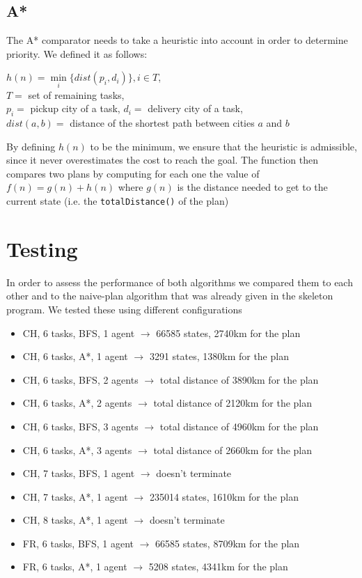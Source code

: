 \documentclass[12pt,a4paper]{article}
\begin{document}
\subsection*{A*}
The A* comparator needs to take a heuristic into account in order to determine priority. We defined it as follows: 
\begin{center}
$h(n) = \min\limits_{i}\lbrace dist(p_i, d_i)\rbrace, i \in T$, \\
$T = $ set of remaining tasks, \\
$p_i = $ pickup city of a task, $d_i = $ delivery city of a task, \\
$dist(a,b) = $ distance of the shortest path between cities $a$ and $b$
\end{center}
By defining $h(n)$ to be the minimum, we ensure that the heuristic is admissible, since it never overestimates the cost to reach the goal. The function then compares two plans by computing for each one the value of $f(n) = g(n) + h(n)$ where $g(n)$ is the distance needed to get to the current state (i.e. the \texttt{totalDistance()} of the plan)

\section{Testing}
In order to assess the performance of both algorithms we compared them to each other and to the naive-plan algorithm that was already given in the skeleton program. We tested these using different configurations
\begin{itemize}
\item CH, 6 tasks, BFS, 1 agent $\rightarrow$ 66585 states, 2740km for the plan
\item CH, 6 tasks, A*, 1 agent $\rightarrow$ 3291 states, 1380km for the plan
\item CH, 6 tasks, BFS, 2 agents $\rightarrow$ total distance of 3890km for the plan
\item CH, 6 tasks, A*, 2 agents $\rightarrow$ total distance of 2120km for the plan
\item CH, 6 tasks, BFS, 3 agents $\rightarrow$ total distance of 4960km for the plan
\item CH, 6 tasks, A*, 3 agents $\rightarrow$ total distance of 2660km for the plan
\item CH, 7 tasks, BFS, 1 agent $\rightarrow$ doesn't terminate
\item CH, 7 tasks, A*, 1 agent $\rightarrow$ 235014 states, 1610km for the plan
\item CH, 8 tasks, A*, 1 agent $\rightarrow$ doesn't terminate
\item FR, 6 tasks, BFS, 1 agent $\rightarrow$ 66585 states, 8709km for the plan
\item FR, 6 tasks, A*, 1 agent $\rightarrow$ 5208 states, 4341km for the plan
\end{itemize}
\end{document}
